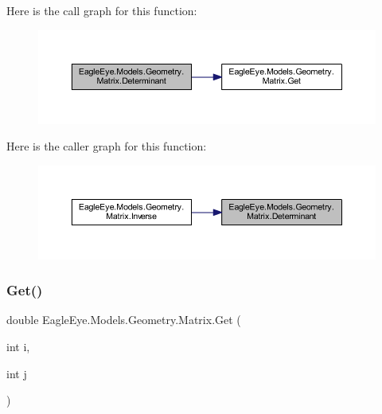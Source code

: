 Here is the call graph for this function\+:\nopagebreak
\begin{figure}[H]
\begin{center}
\leavevmode
\includegraphics[width=350pt]{class_eagle_eye_1_1_models_1_1_geometry_1_1_matrix_a29981530fa3c9397a2b7daf39548647b_cgraph}
\end{center}
\end{figure}
Here is the caller graph for this function\+:\nopagebreak
\begin{figure}[H]
\begin{center}
\leavevmode
\includegraphics[width=350pt]{class_eagle_eye_1_1_models_1_1_geometry_1_1_matrix_a29981530fa3c9397a2b7daf39548647b_icgraph}
\end{center}
\end{figure}
\mbox{\label{class_eagle_eye_1_1_models_1_1_geometry_1_1_matrix_a1b13104b3b70f8886591bffea10d87e5}} 
\subsubsection{\texorpdfstring{Get()}{Get()}}
{\footnotesize\ttfamily double Eagle\+Eye.\+Models.\+Geometry.\+Matrix.\+Get (\begin{DoxyParamCaption}\item[{int}]{i,  }\item[{int}]{j }\end{DoxyParamCaption})}

